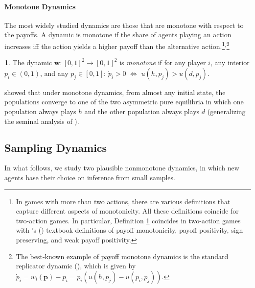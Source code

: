 \documentclass[12pt]{article}
\numberwithin{equation}{section}
\numberwithin{figure}{section}
\theoremstyle{definition}
\newtheorem{defn}{\protect\definitionname}
\theoremstyle{plain}
\theoremstyle{plain}
\theoremstyle{plain}
\theoremstyle{remark}
\theoremstyle{plain}
\theoremstyle{plain}
\providecommand{\definitionname}{Definition}
\begin{document}
\paragraph{Monotone Dynamics}
The most widely studied 
dynamics are those that are monotone with respect to the payoffs.
A dynamic is monotone if the share
of agents playing an action increases iff the action yields a higher
payoff than the alternative
action.\footnote{In games with more than two actions, there are various definitions that capture different aspects of monotonicity. All these definitions coincide for two-action games. In particular, Definition \ref{def-monotone} coincides in two-action games with \citeauthor{weibull1997evolutionary}'s (\citeyear[Section 5.5]{weibull1997evolutionary}) textbook definitions of payoff monotonicity, payoff positivity, sign preserving, and weak payoff positivity.}$^{,}$\footnote{The best-known example of payoff monotone dynamics is the standard
replicator dynamic (\citealp{taylor1979evolutionarily}), which is
given by
$\dot{p}_{i}=w_{i}\left(\textbf{p}\right)-p_{i}=p_{i}\left(u\left(h,p_{j}\right)-u\left(p_{i},p_{j}\right)\right).\label{eq:replicator-dynamics}$}
\begin{defn}\label{def-monotone}
The dynamic $\textbf{w}:\left[0,1\right]^{2}\rightarrow\left[0,1\right]^{2}$
is \emph{monotone} if for any player $i$, any interior $p_{i}\in\left(0,1\right)$,
and any $p_{j}\in\left[0,1\right]$: $\dot{p}_{i}>0\,\,\Leftrightarrow\,\,u\left(h,p_{j}\right)>u\left(d,p_{j}\right).$ 
\end{defn}
\cite{oprea2011separating} showed that under monotone dynamics, from almost any initial state, the populations converge to one of the two asymmetric pure equilibria in which one population always plays
$h$ and the other population always plays $d$ (generalizing the seminal analysis of \citealp{smith1976logic}). 

\subsection{Sampling Dynamics}
In what follows, 
we study two plausible nonmonotone dynamics, in which new agents base their choice on inference from small samples. 
\end{document}
